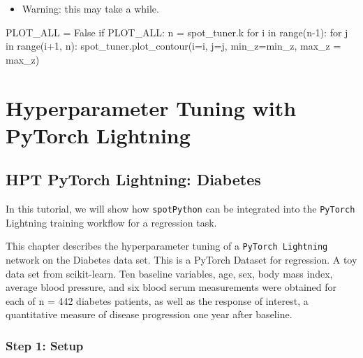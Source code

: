 \documentclass[
  letterpaper,
  DIV=11,
  numbers=noendperiod]{scrreprt}
\newenvironment{Shaded}{\begin{snugshade}}{\end{snugshade}}
\newcommand{\BuiltInTok}[1]{\textcolor[rgb]{0.00,0.23,0.31}{#1}}
\newcommand{\ControlFlowTok}[1]{\textcolor[rgb]{0.00,0.23,0.31}{#1}}
\newcommand{\DecValTok}[1]{\textcolor[rgb]{0.68,0.00,0.00}{#1}}
\newcommand{\KeywordTok}[1]{\textcolor[rgb]{0.00,0.23,0.31}{#1}}
\newcommand{\NormalTok}[1]{\textcolor[rgb]{0.00,0.23,0.31}{#1}}
\newcommand{\OperatorTok}[1]{\textcolor[rgb]{0.37,0.37,0.37}{#1}}
\newcommand{\VariableTok}[1]{\textcolor[rgb]{0.07,0.07,0.07}{#1}}
\providecommand{\tightlist}{%
  \setlength{\itemsep}{0pt}\setlength{\parskip}{0pt}}\usepackage{longtable,booktabs,array}
\begin{document}
\begin{itemize}
\tightlist
\item
  Warning: this may take a while.
\end{itemize}

\begin{Shaded}
\begin{Highlighting}[]
\NormalTok{PLOT\_ALL }\OperatorTok{=} \VariableTok{False}
\ControlFlowTok{if}\NormalTok{ PLOT\_ALL:}
\NormalTok{    n }\OperatorTok{=}\NormalTok{ spot\_tuner.k}
    \ControlFlowTok{for}\NormalTok{ i }\KeywordTok{in} \BuiltInTok{range}\NormalTok{(n}\OperatorTok{{-}}\DecValTok{1}\NormalTok{):}
        \ControlFlowTok{for}\NormalTok{ j }\KeywordTok{in} \BuiltInTok{range}\NormalTok{(i}\OperatorTok{+}\DecValTok{1}\NormalTok{, n):}
\NormalTok{            spot\_tuner.plot\_contour(i}\OperatorTok{=}\NormalTok{i, j}\OperatorTok{=}\NormalTok{j, min\_z}\OperatorTok{=}\NormalTok{min\_z, max\_z }\OperatorTok{=}\NormalTok{ max\_z)}
\end{Highlighting}
\end{Shaded}

\part{Hyperparameter Tuning with PyTorch Lightning}

\chapter{HPT PyTorch Lightning:
Diabetes}\label{hpt-pytorch-lightning-diabetes}

In this tutorial, we will show how \texttt{spotPython} can be integrated
into the \texttt{PyTorch} Lightning training workflow for a regression
task.

This chapter describes the hyperparameter tuning of a
\texttt{PyTorch\ Lightning} network on the Diabetes data set. This is a
PyTorch Dataset for regression. A toy data set from scikit-learn. Ten
baseline variables, age, sex, body mass index, average blood pressure,
and six blood serum measurements were obtained for each of n = 442
diabetes patients, as well as the response of interest, a quantitative
measure of disease progression one year after baseline.

\section{Step 1: Setup}\label{sec-setup-31}
\end{document}
